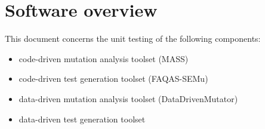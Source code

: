 
\chapter{Software overview}


This document concerns the unit testing of the following components:
\begin{itemize}
	\item code-driven mutation analysis toolset (MASS)
	\item code-driven test generation toolset (FAQAS-SEMu)
	\item data-driven mutation analysis toolset (DataDrivenMutator)
	\item data-driven test generation toolset
\end{itemize}


